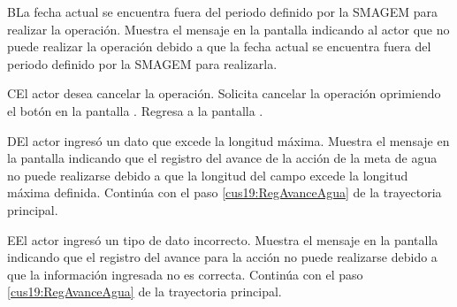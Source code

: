  \begin{UCtrayectoriaA}{B}{La fecha actual se encuentra fuera del periodo definido por la SMAGEM para realizar la operación.}
    \UCpaso[\UCsist] Muestra el mensaje  en la pantalla  indicando al actor que no puede realizar la operación debido a que la fecha actual se encuentra fuera del periodo definido por la SMAGEM para realizarla. 
    \end{UCtrayectoriaA}

    \begin{UCtrayectoriaA}{C}{El actor desea cancelar la operación.}
      \UCpaso[\UCactor] Solicita cancelar la operación oprimiendo el botón  en la pantalla .
      \UCpaso[] Regresa a la pantalla . 
    \end{UCtrayectoriaA}
        
    \begin{UCtrayectoriaA}{D}{El actor ingresó un dato que excede la longitud máxima.}    
	\UCpaso[\UCsist] Muestra el mensaje  en la pantalla  indicando que el registro del avance de la acción de la meta de agua no puede realizarse debido a que la longitud del campo excede la longitud máxima definida.
	\UCpaso[] Continúa con el paso \ref{cus19:RegAvanceAgua} de la trayectoria principal.     
    \end{UCtrayectoriaA}
 
    \begin{UCtrayectoriaA}{E}{El actor ingresó un tipo de dato incorrecto.}    
	\UCpaso[\UCsist] Muestra el mensaje  en la pantalla  indicando que el registro del avance para la acción no puede realizarse debido a que la información ingresada no es correcta.
	\UCpaso[] Continúa con el paso \ref{cus19:RegAvanceAgua} de la trayectoria principal.     
    \end{UCtrayectoriaA}